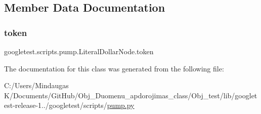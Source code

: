 \subsection{Member Data Documentation}
\mbox{\label{classgoogletest_1_1scripts_1_1pump_1_1_literal_dollar_node_a17502f972bd3dbd33a7aa470f9f41b05}} 
\subsubsection{\texorpdfstring{token}{token}}
{\footnotesize\ttfamily googletest.\+scripts.\+pump.\+Literal\+Dollar\+Node.\+token}



The documentation for this class was generated from the following file\+:\begin{DoxyCompactItemize}
\item 
C\+:/\+Users/\+Mindaugas K/\+Documents/\+Git\+Hub/\+Obj\+\_\+\+Duomenu\+\_\+apdorojimas\+\_\+class/\+Obj\+\_\+test/lib/googletest-\/release-\/1../googletest/scripts/\mbox{\hyperlink{_obj__test_2lib_2googletest-release-1_88_81_2googletest_2scripts_2pump_8py}{pump.\+py}}\end{DoxyCompactItemize}
